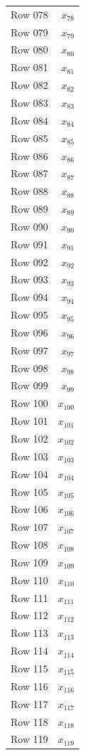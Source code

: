 \documentclass{article}
\begin{document}
\begin{longtable}{lr}
Row 078 & $x_{78}$ \\
Row 079 & $x_{79}$ \\
Row 080 & $x_{80}$ \\
Row 081 & $x_{81}$ \\
Row 082 & $x_{82}$ \\
Row 083 & $x_{83}$ \\
Row 084 & $x_{84}$ \\
Row 085 & $x_{85}$ \\
Row 086 & $x_{86}$ \\
Row 087 & $x_{87}$ \\
Row 088 & $x_{88}$ \\
Row 089 & $x_{89}$ \\
Row 090 & $x_{90}$ \\
Row 091 & $x_{91}$ \\
Row 092 & $x_{92}$ \\
Row 093 & $x_{93}$ \\
Row 094 & $x_{94}$ \\
Row 095 & $x_{95}$ \\
Row 096 & $x_{96}$ \\
Row 097 & $x_{97}$ \\
Row 098 & $x_{98}$ \\
Row 099 & $x_{99}$ \\
Row 100 & $x_{100}$ \\
Row 101 & $x_{101}$ \\
Row 102 & $x_{102}$ \\
Row 103 & $x_{103}$ \\
Row 104 & $x_{104}$ \\
Row 105 & $x_{105}$ \\
Row 106 & $x_{106}$ \\
Row 107 & $x_{107}$ \\
Row 108 & $x_{108}$ \\
Row 109 & $x_{109}$ \\
Row 110 & $x_{110}$ \\
Row 111 & $x_{111}$ \\
Row 112 & $x_{112}$ \\
Row 113 & $x_{113}$ \\
Row 114 & $x_{114}$ \\
Row 115 & $x_{115}$ \\
Row 116 & $x_{116}$ \\
Row 117 & $x_{117}$ \\
Row 118 & $x_{118}$ \\
Row 119 & $x_{119}$ \\

\end{longtable}
\end{document}
